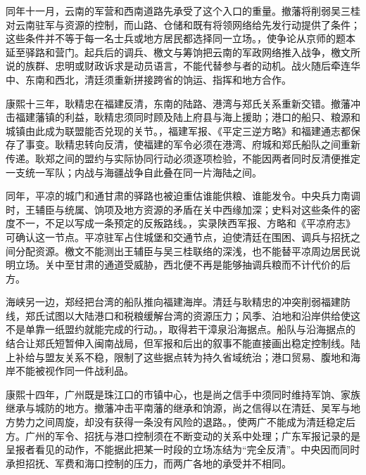 同年十一月，云南的军营和西南道路先承受了这个入口的重量。撤藩将削弱吴三桂对云南驻军与资源的控制，而山路、仓储和既有将领网络给先发行动提供了条件；这些条件并不等于每一名士兵或地方居民都选择同一立场。，使争论从京师的题本延至驿路和营门。起兵后的调兵、檄文与筹饷把云南的军政网络推入战争，檄文所说的族群、忠明或财政诉求是动员语言，不能代替参与者的动机。战火随后牵连华中、东南和西北，清廷须重新拼接跨省的饷运、指挥和地方合作。

康熙十三年，耿精忠在福建反清，东南的陆路、港湾与郑氏关系重新交错。撤藩冲击福建藩镇的利益，耿精忠须同时顾及陆上府县与海上援助；港口的船只、粮源和城镇由此成为联盟能否兑现的关节。，福建军报、《平定三逆方略》和福建通志都保存了事变。耿精忠转向反清，使福建的军令必须在港湾、府城和郑氏船队之间重新传递。耿郑之间的盟约与实际协同行动必须逐项检验，不能因两者同时反清便推定一支统一军队；内战与海疆战争自此叠在同一片海陆之间。

同年，平凉的城门和通甘肃的驿路也被迫重估谁能供粮、谁能发令。中央兵力南调时，王辅臣与统属、饷项及地方资源的矛盾在关中西缘加深；史料对这些条件的密度不一，不足以写成一条预定的反叛路线。，实录陕西军报、方略和《平凉府志》可确认这一节点。平凉驻军占住城堡和交通节点，迫使清廷在围困、调兵与招抚之间分配资源。檄文不能测出王辅臣与吴三桂联络的深浅，也不能替平凉周边居民说明立场。关中至甘肃的通道受威胁，西北便不再是能够抽调兵粮而不计代价的后方。

海峡另一边，郑经把台湾的船队推向福建海岸。清廷与耿精忠的冲突削弱福建防线，郑氏试图以大陆港口和税粮缓解台湾的资源压力；风季、泊地和沿岸供给使这不是单靠一纸盟约就能完成的行动。，取得若干漳泉沿海据点。船队与沿海据点的结合让郑氏短暂伸入闽南战局，但军报和后出的叙事不能直接画出稳定控制线。陆上补给与盟友关系不稳，限制了这些据点转为持久省域统治；港口贸易、腹地和海岸不能被视作同一件战利品。

康熙十四年，广州既是珠江口的市镇中心，也是尚之信手中须同时维持军饷、家族继承与城防的地方。撤藩冲击平南藩的继承和饷源，尚之信得以在清廷、吴军与地方势力之间周旋，却没有获得一条没有风险的退路。，使两广不能成为清廷稳定后方。广州的军令、招抚与港口控制须在不断变动的关系中处理；广东军报记录的是呈报者看见的动作，不能据此把某一时段的立场冻结为“完全反清”。中央因而同时承担招抚、军费和海口控制的压力，而两广各地的承受并不相同。

